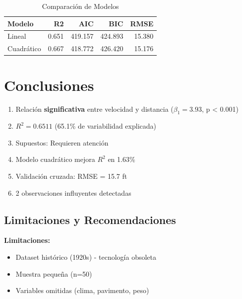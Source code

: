\documentclass[10pt, spanish]{article}\usepackage[]{graphicx}\usepackage[]{xcolor}
\newcommand{\critical}[1]{\textcolor{CriticalRed}{\textbf{#1}}}
\begin{document}
\begin{table}[ht]
\centering
\caption{Comparación de Modelos} 
\begin{tabular}{lrrrr}
  \toprule
Modelo & R2 & AIC & BIC & RMSE \\ 
  \midrule
Lineal & 0.651 & 419.157 & 424.893 & 15.380 \\ 
  Cuadrático & 0.667 & 418.772 & 426.420 & 15.176 \\ 
   \bottomrule
\end{tabular}
\end{table}


\section{Conclusiones}

\begin{tcolorbox}[colback=SuccessGreen!10, colframe=SuccessGreen, arc=0pt,
                  boxrule=0.8pt, title=HALLAZGOS PRINCIPALES]
\begin{enumerate}[leftmargin=15pt, itemsep=3pt]
    \item Relación \critical{significativa} entre velocidad y distancia ($\beta_1 = 3.93$, p < 0.001)

    \item $R^2 = 0.6511$ (65.1\% de variabilidad explicada)

    \item Supuestos: Requieren atención

    \item Modelo cuadrático mejora $R^2$ en 1.63\%

    \item Validación cruzada: RMSE = 15.7 ft

    \item 2 observaciones influyentes detectadas
\end{enumerate}
\end{tcolorbox}

\subsection{Limitaciones y Recomendaciones}

\textbf{Limitaciones:}
\begin{itemize}[leftmargin=15pt, itemsep=2pt]
\item Dataset histórico (1920s) - tecnología obsoleta
\item Muestra pequeña (n=50)
\item Variables omitidas (clima, pavimento, peso)
\end{itemize}
\end{document}
